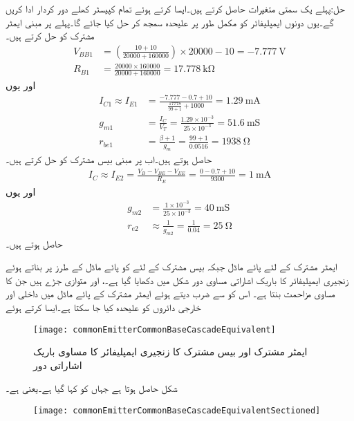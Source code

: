 حل:پہلے یک سمتی متغیرات حاصل کرتے ہیں۔ایسا کرتے ہوئے تمام کپیسٹر کھلے دور کردار ادا کریں گے۔یوں دونوں ایمپلیفائر کو مکمل طور پر علیحدہ سمجھ کر حل کیا جائے گا۔پہلے  پر مبنی  ایمٹر مشترک کو حل کرتے ہیں۔
\begin{align*}
V_{BB1}&=\left(\frac{10+10}{20000+160000}\right) \times 20000-10=\SI{-7.777}{\volt}\\
R_{B1}&=\frac{20000 \times 160000}{20000+160000}=\SI{17.778}{\kilo \ohm}
\end{align*} 
اور یوں
\begin{align*}
I_{C1} \approx I_{E1}&=\frac{-7.777-0.7+10}{\frac{17778}{99+1}+1000}=\SI{1.29}{\milli \ampere}\\
g_{m1}&=\frac{I_C}{V_T}=\frac{1.29 \times 10^{-3}}{25 \times 10^{-3}}=\SI{51.6}{\milli \siemens}\\
r_{be1}&=\frac{\beta+1}{g_m}=\frac{99+1}{0.0516}=\SI{1938}{\ohm}
\end{align*}
حاصل ہوتے ہیں۔اب  پر مبنی بیس مشترک کو حل کرتے ہیں۔
\begin{align*}
I_{C} \approx I_{E2}=\frac{V_B-V_{BE}-V_{EE}}{R_E}=\frac{0-0.7+10}{9300}=\SI{1}{\milli \ampere}
\end{align*}
اور یوں
\begin{align*}
g_{m2}&=\frac{1 \times 10^{-3}}{25 \times 10^{-3}}=\SI{40}{\milli \siemens}\\
r_{e2}&\approx \frac{1}{g_{m2}}=\frac{1}{0.04}=\SI{25}{\ohm}
\end{align*}
حاصل ہوتے ہیں۔

ایمٹر مشترک کے لئے پائے ماڈل جبکہ بیس مشترک کے لئے  کو پائے ماڈل کے طرز پر بناتے ہوئے زنجیری ایمپلیفائر کا باریک اشاراتی مساوی دور شکل  میں دکھایا گیا ہے۔،  اور  متوازی جڑے ہیں جن کا مساوی مزاحمت   بنتا ہے۔ اس کو  سے ضرب دیتے ہوئے ایمٹر مشترک کے پائے ماڈل میں داخلی اور خارجی دائروں کو علیحدہ کیا جا سکتا ہے۔ایسا کرتے ہوئے
\begin{figure}
\centering
\texttt{[image: commonEmitterCommonBaseCascadeEquivalent]}
\caption{ایمٹر مشترک اور بیس مشترک کا زنجیری ایمپلیفائر کا مساوی باریک اشاراتی دور}
\label{شکل_ٹرانزسٹر_مخارج_مشترک_قابو_مشترک_زنجیر_مساوی}
\end{figure}
شکل  حاصل ہوتا ہے جہاں  کو  کہا گیا ہے۔یعنی  ہے۔
\begin{figure}
\centering
\texttt{[image: commonEmitterCommonBaseCascadeEquivalentSectioned]}
\caption{}
\label{شکل_ٹرانزسٹر_مخارج_مشترک_قابو_مشترک_زنجیر_مساوی_الف}
\end{figure}

